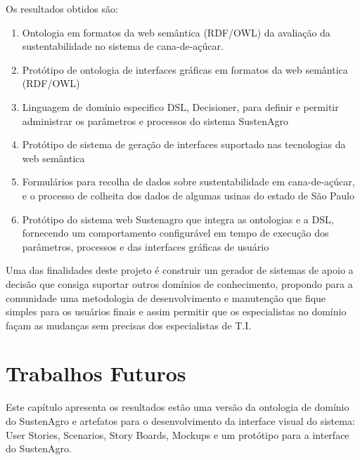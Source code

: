 Os resultados obtidos são: 
\begin{enumerate}
\item Ontologia em formatos da web semântica (RDF/OWL) da avaliação da sustentabilidade
no sistema de cana-de-açúcar. 
\item Protótipo de ontologia de interfaces gráficas em formatos da web semântica
(RDF/OWL) 
\item Linguagem de domínio especifico DSL, Decisioner, para definir e permitir
administrar os parâmetros e processos do sistema SustenAgro 
\item Protótipo de sistema de geração de interfaces suportado nas tecnologias
da web semântica 
\item Formulários para recolha de dados sobre sustentabilidade em cana-de-açúcar,
e o processo de colheita dos dados de algumas usinas do estado de
São Paulo 
\item Protótipo do sistema web Sustenagro que integra as ontologias e a
DSL, fornecendo um comportamento configurável em tempo de execução
dos parâmetros, processos e das interfaces gráficas de usuário
\end{enumerate}
Uma das finalidades deste projeto é construir um gerador de sistemas
de apoio a decisão que consiga suportar outros domínios de conhecimento,
propondo para a comunidade uma metodologia de desenvolvimento e manutenção
que fique simples para os usuários finais e assim permitir que os
especialistas no domínio façam as mudanças sem precisas dos especialistas
de T.I.

\section{Trabalhos Futuros}

Este capítulo apresenta os resultados estão uma versão da ontologia
de domínio do SustenAgro e artefatos para o desenvolvimento da interface
visual do sistema: User Stories, Scenarios, Story Boards, Mockups
e um protótipo para a interface do SustenAgro.

